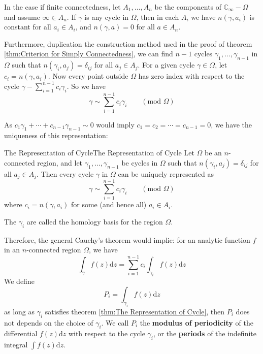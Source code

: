 \documentclass[../main.tex]{subfiles}
\begin{document}
In the case if finite connectedness, let $A_1, \ldots ,A_n$ be the components of $\mathbb{C}_{\infty }-\Omega$ and assume $\infty \in A_n$. If $\gamma$ is any cycle in $\Omega$, then in each $A_i$ we have $n(\gamma,a_i)$ is constant for all $a_i\in A_i$, and $n(\gamma,a)=0$ for all $a\in A_n$. 

Furthermore, duplication the construction method used in the proof of theorem \ref{thm:Criterion for Simply Connectedness}, we can find $n-1$ cycles $\gamma_1, \ldots ,\gamma_{n-1}$ in $\Omega$ such that $n(\gamma_i,a_j) = \delta_{ij}$ for all $a_j\in A_j$. For a given cycle $\gamma\in \Omega$, let $c_i = n(\gamma,a_i)$. Now every point outside $\Omega$ has zero index with respect to the cycle $\gamma - \sum_{i=1}^{n-1} c_i \gamma_i$. So we have
\begin{equation}
	\gamma \sim \sum_{i=1}^{n-1} c_i \gamma_i\qquad (\text{mod } \Omega)
\end{equation}

As $c_1 \gamma_1 + \cdots + c_{n-1} \gamma_{n-1}\sim 0$ would imply $c_1 = c_2 = \cdots = c_{n-1} = 0$, we have the uniqueness of this representation:
\begin{theorem}{The Representation of Cycle}{The Representation of Cycle}
	Let $\Omega$ be an $n$-connected region, and let $\gamma_1, \ldots ,\gamma_{n-1}$ be cycles in $\Omega$ such that $n(\gamma_i,a_j) = \delta_{ij}$ for all $a_j\in A_j$. Then every cycle $\gamma$ in $\Omega$ can be uniquely represented as
	\begin{equation*}
		\gamma \sim \sum_{i=1}^{n-1} c_i \gamma_i \qquad (\text{mod } \Omega)
	\end{equation*}
	where $c_i = n(\gamma,a_i)$ for some (and hence all) $a_i\in A_i$.

	The $\gamma_i$ are called the homology basis for the region $\Omega$.
\end{theorem}

Therefore, the general Cauchy's theorem would implie: for an analytic function $f$ in an $n$-connected region $\Omega$, we have
\begin{equation}
	\int_{\gamma} f(z) \mathrm{d} z = \sum_{i=1}^{n-1} c_i \int_{\gamma_i} f(z) \mathrm{d} z
\end{equation}
We define
\begin{equation}
	P_i = \int_{\gamma_i} f(z) \mathrm{d} z
\end{equation}
as long as $\gamma_i$ satisfies theorem \ref{thm:The Representation of Cycle}, then $P_i$ does not depends on the choice of $\gamma_i$. We call $P_i$ the \textbf{modulus of periodicity} of the differential $f(z) \mathrm{d} z$ with respect to the cycle $\gamma_i$, or the \textbf{periods} of the indefinite integral $\int f(z) \mathrm{d} z$.
\end{document}
